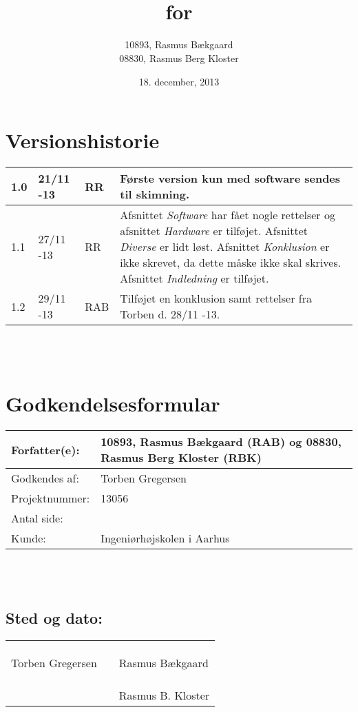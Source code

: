 \documentclass[oneside, 12pt]{memoir}
\title{\DocumentType \\ for \\ \ProjectName}
\date{18. december, 2013}
\author{10893, Rasmus Bækgaard\\08830, Rasmus Berg Kloster}
\begin{document}
\begin{titlingpage}
  \maketitle
\end{titlingpage}


\section*{Versionshistorie}
\begin{tabular}{p{}|p{}|p{}|p{}}
1.0 & 21/11 -13 & RR & Første version kun med software sendes til skimning.
\\ \hline
1.1 & 27/11 -13 & RR & Afsnittet \textit{Software} har fået nogle rettelser og afsnittet \textit{Hardware} er tilføjet. Afsnittet \textit{Diverse} er lidt løst.
Afsnittet \textit{Konklusion} er ikke skrevet, da dette måske ikke skal skrives.
Afsnittet \textit{Indledning} er tilføjet.
\\ \hline
1.2 & 29/11 -13 & RAB & Tilføjet en konklusion samt rettelser fra Torben d. 28/11 -13.
\end{tabular} 
\\
\\
\section*{Godkendelsesformular}
\begin{tabular}{p{}|p{}}
\hline 
Forfatter(e): & 10893, Rasmus Bækgaard (RAB) og 08830, Rasmus Berg Kloster (RBK)\\ 
\hline 
Godkendes af: & Torben Gregersen \\ 
\hline
Projektnummer: & 13056\\
\hline
Antal side: & \pageref{LastPage} \\
\hline 
Kunde: & Ingeniørhøjskolen i Aarhus \\
\hline
\end{tabular} 
\\
\\
\subsection*{Sted og dato:}
\begin{tabular}{p{} p{} p{}}
&& \\
&& \\
\underline{\qquad \qquad \qquad \qquad \qquad} & \qquad \qquad \qquad & \underline{\qquad \qquad \qquad \qquad \qquad}  \\ 
Torben Gregersen & & Rasmus Bækgaard \\ \\\\
&&  \underline{\qquad \qquad \qquad \qquad \qquad}  \\
& & Rasmus B. Kloster
\end{tabular} 




\newpage
\tableofcontents*
\listoffigures* 

\listoffixmes 







\newpage
\appendix



\end{document}
